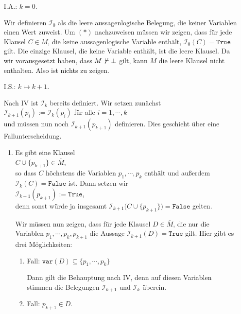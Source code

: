 \begin{enumerate}
\item[I.A.:] $k=0$.
 
  Wir definieren $\mathcal{I}_0$ als die leere aussagenlogische Belegung, die keiner
  Variablen einen Wert zuweist.  Um $(*)$ nachzuweisen müssen wir zeigen, dass für jede Klausel $C \in M$, die
  keine aussagenlogische Variable enthält, $\mathcal{I}_0(C) = \mathtt{True}$ gilt.  Die einzige Klausel, die
  keine Variable enthält, ist die leere Klausel.  Da wir vorausgesetzt haben, dass  $M \not\,\vdash \bot$
  gilt, kann $M$ die leere Klausel nicht enthalten.  Also ist nichts zu zeigen.
\item[I.S.:] $k \mapsto k+1$.

  Nach IV ist $\mathcal{I}_k$ bereits definiert.  Wir setzen zunächst
  \\[0.2cm]
  \hspace*{1.3cm}
  $\mathcal{I}_{k+1}(p_i) := \mathcal{I}_k(p_i)$ \quad für alle $i=1,\cdots,k$
  \\[0.2cm]
  und müssen nun noch $\mathcal{I}_{k+1}(p_{k+1})$ definieren.  Dies geschieht über eine Fallunterscheidung.
  \begin{enumerate}
  \item Es gibt eine Klausel
    \\[0.2cm]
    \hspace*{1.3cm}
    $C \cup \{p_{k+1}\} \in \overline{M}$,
    \\[0.2cm]
    so dass $C$ höchstens die Variablen $p_1,\cdots,p_k$ enthält und außerdem $\mathcal{I}_k(C) = \mathtt{False}$
    ist.  Dann setzen wir
    \\[0.2cm]
    \hspace*{1.3cm}
    $\mathcal{I}_{k+1}(p_{k+1}) := \mathtt{True}$,
    \\[0.2cm]    
    denn sonst würde ja insgesamt $\mathcal{I}_{k+1}\bigl(C \cup \{p_{k+1}\}\bigr) = \mathtt{False}$ gelten. 

    Wir müssen nun zeigen, dass für jede Klausel $D \in \overline{M}$, die nur die Variablen
    $p_1,\cdots,p_k,p_{k+1}$ die Aussage $\mathcal{I}_{k+1}(D) = \mathtt{True}$ gilt.  Hier gibt es drei
    Möglichkeiten:
    \begin{enumerate}[1.]
    \item Fall: $\mathtt{var}(D) \subseteq \{p_1,\cdots,p_k\}$

          Dann gilt die Behauptung nach IV, denn auf diesen Variablen stimmen die Belegungen
          $\mathcal{I}_{k+1}$ und $\mathcal{I}_k$ überein.
    \item Fall: $p_{k+1} \in D$.
          

\end{enumerate}
\end{enumerate}
\end{enumerate}
